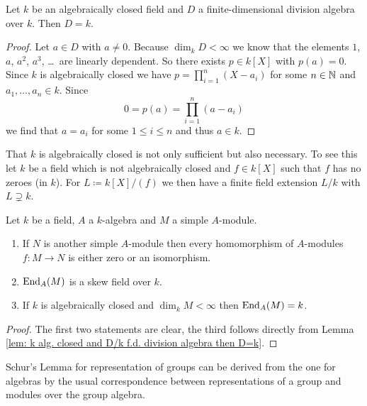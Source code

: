 \begin{lem}\label{lem: k alg. closed and D/k f.d. division algebra then D=k}
 Let $k$ be an algebraically closed field and $D$ a finite-dimensional division algebra over $k$. Then $D = k$.
\end{lem}
\begin{proof}
 Let $a \in D$ with $a \neq 0$. Because $\dim_k D < \infty$ we know that the elements $1$, $a$, $a^2$, $a^3$, \dots\ are linearly dependent. So there exists $p \in k[X]$ with $p(a) = 0$. Since $k$ is algebraically closed we have $p = \prod_{i=1}^n (X-a_i)$ for some $n \in \mathbb{N}$ and $a_1, \dotsc, a_n \in k$. Since
 \[
  0 = p(a) = \prod_{i=1}^n (a-a_i)
 \]
 we find that $a = a_i$ for some $1 \leq i \leq n$ and thus $a \in k$.
\end{proof}


\begin{rem}
 That $k$ is algebraically closed is not only sufficient but also necessary. To see this let $k$ be a field which is not algebraically closed and $f \in k[X]$ such that $f$ has no zeroes (in $k$). For $L \coloneqq k[X]/(f)$ we then have a finite field extension $L/k$ with $L \supsetneq k$.
\end{rem}


\begin{lem}
 Let $k$ be a field, $A$ a $k$-algebra and $M$ a simple $A$-module.
 \begin{enumerate}[label=\emph{\alph*})]
  \item
   If $N$ is another simple $A$-module then every homomorphism of $A$-modules $f \colon M \to N$ is either zero or an isomorphism.
  \item
   $\operatorname{End}_A(M)$ is a skew field over $k$.
  \item
   If $k$ is algebraically closed and $\dim_k M < \infty$ then $\operatorname{End}_A(M) = k$.
 \end{enumerate}
\end{lem}
\begin{proof}
 The first two statements are clear, the third follows directly from Lemma \ref{lem: k alg. closed and D/k f.d. division algebra then D=k}.
\end{proof}


\begin{rem}
 Schur’s Lemma for representation of groups can be derived from the one for algebras by the usual correspondence between representations of a group and modules over the group algebra.
\end{rem}


